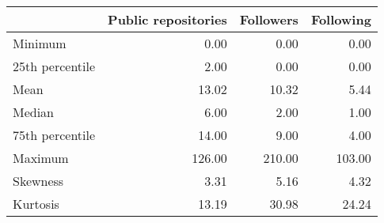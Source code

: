 \begin{tabular}{lrrr}
\toprule
{} &  Public repositories &  Followers &  Following \\
\midrule
Minimum         &                 0.00 &       0.00 &       0.00 \\
25th percentile &                 2.00 &       0.00 &       0.00 \\
Mean            &                13.02 &      10.32 &       5.44 \\
Median          &                 6.00 &       2.00 &       1.00 \\
75th percentile &                14.00 &       9.00 &       4.00 \\
Maximum         &               126.00 &     210.00 &     103.00 \\
Skewness        &                 3.31 &       5.16 &       4.32 \\
Kurtosis        &                13.19 &      30.98 &      24.24 \\
\bottomrule
\end{tabular}
